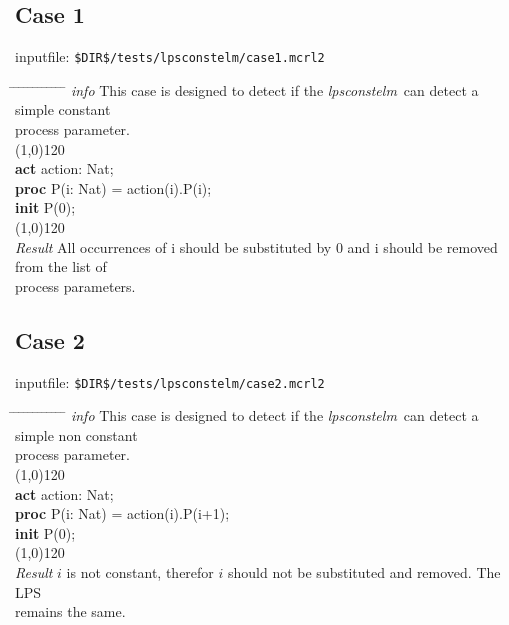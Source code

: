 \index{}\documentclass[a4paper,10pt]{article}
\theoremstyle{plain}
\theoremstyle{definition}
\newcommand{\tool}{\textit{lpsconstelm}}
\newcommand{\pp}{process parameter}
\newcommand{\pps}{process parameters}
\newcommand{\ti}{\textit}
\newcommand{\tb}{\textbf}
\newcommand{\tabw}{\hspace*{15.mm} \= \hspace*{20.mm} \= \hspace*{5.mm} \= \hspace*{5.mm} \= \hspace*{5.mm} \= \hspace*{5.mm}  \= \hspace*{5.mm}  \= \hspace*{5.mm}  \= \hspace*{5.mm} \= \hspace*{5.mm} \= \hspace*{5.mm}  \= \hspace*{5.mm}  \= \hspace*{5.mm}\kill}
\begin{document}
\subsection*{Case 1}
inputfile: \verb"$DIR$/tests/lpsconstelm/case1.mcrl2"
\begin{tabbing}
\tabw
\ti{info} \> This case is designed to detect if the \tool\ can detect a simple constant \\
\> \pp .\\
\line(1,0){120}\\

\tb{act}  \> action: Nat;\\
\tb{proc} \> P(i: Nat) \> = \> action(i).P(i);\\
\tb{init} \> P(0);\\

\line(1,0){120}\\
\ti{Result} 
\> All occurrences of i should be substituted by 0 and i should be removed from the list of \\
\> \pps . \\ 
\end{tabbing}

\subsection*{Case 2}
inputfile: \verb"$DIR$/tests/lpsconstelm/case2.mcrl2"
\begin{tabbing}
\tabw
\ti{info} 
\> This case is designed to detect if the \tool\ can detect a simple non constant \\
\> \pp .\\
\line(1,0){120}\\
\tb{act}  \> action: Nat;\\
\tb{proc} \> P(i: Nat) \> = \> action(i).P(i+1);\\
\tb{init} \> P(0);\\
\line(1,0){120}\\
\ti{Result} \> $i$ is not constant, therefor $i$ should not be substituted and removed. The LPS \\
\> remains the same. \\ 
\end{tabbing}
\end{document}
